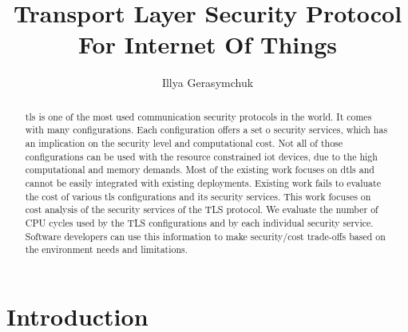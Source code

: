 \documentclass{llncs}
\begin{document}
%
\frontmatter          %
%
\pagestyle{headings}  %
%

\tableofcontents
\newpage

\mainmatter              %
%
\title{Transport Layer Security Protocol For Internet Of Things}
%
%
\author{{Illya Gerasymchuk} \\
}
%
%
%
\maketitle              %

\begin{abstract}
\gls{tls} is one of the most used communication security protocols in the world. It comes with many configurations. 
Each configuration offers a set o security services, which has an implication on the 
security level and computational cost.
Not all of those configurations can be used with the resource constrained \gls{iot} devices, due to the
high computational and memory demands. Most of the existing work focuses on \gls{dtls}
and cannot be easily integrated with existing deployments. Existing work fails
to evaluate the cost of various \gls{tls} configurations and its security services.
This work focuses on cost analysis of the security services of the TLS protocol.
We evaluate the number of CPU cycles used by the TLS configurations
and by each individual security service. Software developers can use this information
to make security/cost trade-offs based on the environment needs and limitations.  

\end{abstract}
%
\section{Introduction}
%
\end{document}
